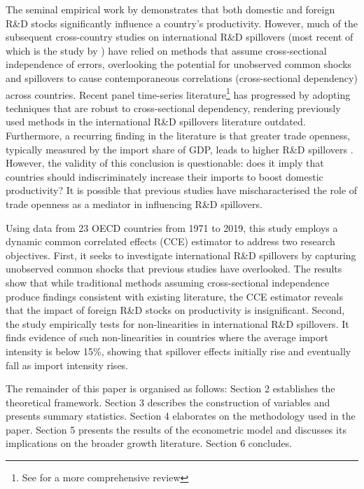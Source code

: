 \documentclass[12pt]{article}
\begin{document}
The seminal empirical work by \citet{Coe1995} demonstrates that both domestic and foreign R\&D stocks significantly influence a country's productivity. However, much of the subsequent cross-country studies on international R\&D spillovers (most recent of which is the study by \citet{Coe2009}) have relied on methods that assume cross-sectional independence of errors, overlooking the potential for unobserved common shocks and spillovers to cause contemporaneous correlations (cross-sectional dependency) across countries. Recent panel time-series literature\footnote{See \citet{Chudik2015} for a more comprehensive review} has progressed by adopting techniques that are robust to cross-sectional dependency, rendering previously used methods in the international R\&D spillovers literature outdated. Furthermore, a recurring finding in the literature is that greater trade openness, typically measured by the import share of GDP, leads to higher R\&D spillovers \citep{Coe1995, Coe2009, Lichtenberg1998}. However, the validity of this conclusion is questionable: does it imply that countries should indiscriminately increase their imports to boost domestic productivity? It is possible that previous studies have mischaracterised the role of trade openness as a mediator in influencing R\&D spillovers.

Using data from 23 OECD countries from 1971 to 2019, this study employs a dynamic common correlated effects (CCE) estimator to address two research objectives. First, it seeks to investigate international R\&D spillovers by capturing unobserved common shocks that previous studies have overlooked. The results show that while traditional methods assuming cross-sectional independence produce findings consistent with existing literature, the CCE estimator reveals that the impact of foreign R\&D stocks on productivity is insignificant. Second, the study empirically tests for non-linearities in international R\&D spillovers. It finds evidence of such non-linearities in countries where the average import intensity is below 15\%, showing that spillover effects initially rise and eventually fall as import intensity rises. 

The remainder of this paper is organised as follows: Section 2 establishes the theoretical framework. Section 3 describes the construction of variables and presents summary statistics. Section 4 elaborates on the methodology used in the paper. Section 5 presents the results of the econometric model and discusses its implications on the broader growth literature. Section 6 concludes.
\end{document}
